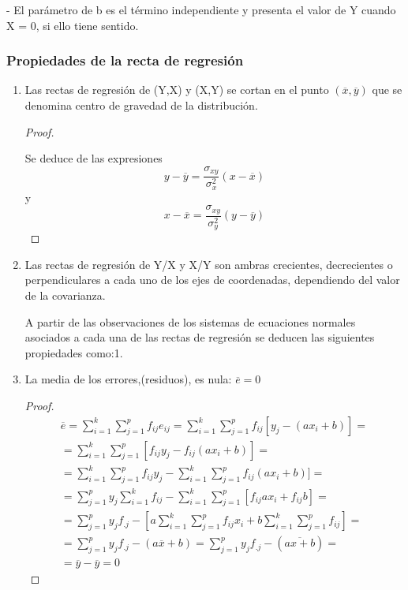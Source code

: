 \documentclass{article}
\begin{document}
	- El parámetro de b es el término independiente y presenta el valor de Y cuando X = 0, si ello tiene sentido.
	
	\subsubsection{Propiedades de la recta de regresión}
	
\begin{enumerate}

	
\item Las rectas de regresión de (Y,X) y (X,Y)  se cortan en el punto $(\overline{x},\overline{y})$ que se denomina centro de gravedad de la distribución.

\begin{proof}
$ $\newline

Se deduce de las expresiones
$$ y - \overline{y} = \frac{\sigma_{xy}}{\sigma_x^2} (x - \overline{x}) $$
y 
$$ x - \overline{x} = \frac{\sigma_{xy}}{\sigma_y^2} (y - \overline{y} ) $$
\end{proof}
\item Las rectas de regresión de Y/X y X/Y son ambras crecientes, decrecientes o perpendiculares a cada uno de los ejes de coordenadas, dependiendo del valor de la covarianza.

A partir de las observaciones de los sistemas de ecuaciones normales asociados a cada una de las rectas de regresión se deducen las siguientes propiedades como:1.

\item La media de los errores,(residuos), es nula: $\overline{e} = 0$

\begin{proof}
$ $\newline
\begin{align*}
\overline{e} = \sum_{i=1}^k\sum_{j=1}^p f_{ij}e_{ij} = \sum_{i=1}^k\sum_{j=1}^p f_{ij}[y_j - (ax_i +b)]  = \\
    = \sum_{i=1}^k\sum_{j=1}^p [f_{ij}y_j - f_ {ij}(ax_i +b)] = \\
    = \sum_{i=1}^k\sum_{j=1}^p f_{ij}y_j - \sum_{i=1}^k\sum_{j=1}^p f_ {ij}(ax_i +b)] = \\
    = \sum_{j=1}^p y_j \sum_{i=1}^k f_{ij} - \sum_{i=1}^k\sum_{j=1}^p [f_{ij}ax_i + f_{ij}b] = \\
    = \sum_{j=1}^p y_j f_{.j} - \left[a\sum_{i=1}^k\sum_{j=1}^p f_{ij}  x_i   +  b\sum_{i=1}^k\sum_{j=1}^p f_{ij}\right] = \\ 
     = \sum_{j=1}^p y_j f_{.j} - (a\overline{x}+b) = \sum_{j=1}^p y_j f_{.j} - (\overline{ax+b}) = \\
	= \overline{y} - \overline{y} = 0
\end{align*}
	

\end{proof}
\end{enumerate}
\end{document}
